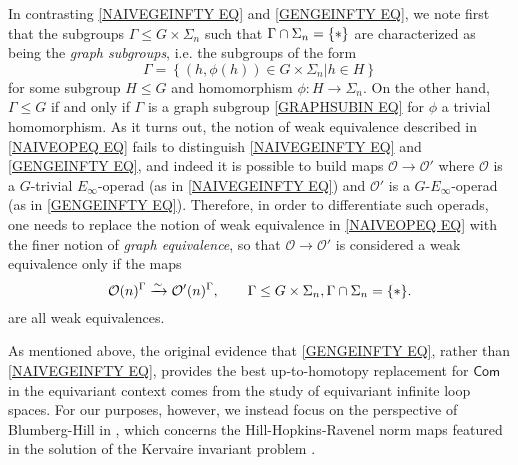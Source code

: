 \documentclass[a4paper,10pt
,draft
]{article}%
\numberwithin{equation}{section}
\numberwithin{figure}{section}
\theoremstyle{definition} %
\renewcommand{\O}{\ensuremath{\mathcal O}}
\newcommand{\1}{\ensuremath{\mathbbm 1}}%
\begin{document}
In contrasting 
\eqref{NAIVEGEINFTY EQ} and \eqref{GENGEINFTY EQ},
we note first that the subgroups $\Gamma \leq G \times \Sigma_n$ such that $\Gamma \cap \Sigma_n = \{\**\}$
are characterized as being the 
\emph{graph subgroups},
i.e. the subgroups of the form
\begin{equation}\label{GRAPHSUBIN EQ}
	\Gamma = \left\{(h,\phi(h)) \in G \times \Sigma_n
	| h \in H\right\}
\end{equation}
for some subgroup $H \leq G$ and homomorphism
$\phi \colon H \to \Sigma_n$.
On the other hand, $\Gamma \leq G$ if and only if $\Gamma$ is a graph subgroup \eqref{GRAPHSUBIN EQ} for $\phi$ a trivial homomorphism. 
As it turns out, the notion of weak equivalence described in \eqref{NAIVEOPEQ EQ} fails to distinguish
\eqref{NAIVEGEINFTY EQ} and \eqref{GENGEINFTY EQ}, 
and indeed it is possible
to build maps $\O \to \O'$ where
$\O$ is a $G$-trivial $E_{\infty}$-operad (as in \eqref{NAIVEGEINFTY EQ})
and $\O'$ is a $G$-$E_{\infty}$-operad 
(as in \eqref{GENGEINFTY EQ}).
Therefore, in order to differentiate such operads, one needs to replace the notion of weak equivalence in \eqref{NAIVEOPEQ EQ} 
with the finer notion of \textit{graph equivalence}, 
so that $\O \to \O'$ is considered a weak equivalence only if
the maps
\begin{equation}\label{GENEOPEQ EQ}
	\O(n)^{\Gamma} \xrightarrow{\sim} \O'(n)^{\Gamma}, \qquad
	\Gamma \leq G\times \Sigma_n, \Gamma \cap \Sigma_n = \{\**\}.
\end{equation}
are all weak equivalences.

As mentioned above, the original evidence \cite{CW91}
that \eqref{GENGEINFTY EQ}, 
rather than \eqref{NAIVEGEINFTY EQ}, 
provides the best up-to-homotopy replacement for $\mathsf{Com}$ in the equivariant context comes from the study of equivariant infinite loop spaces. %
For our purposes, however, we instead focus on the perspective of Blumberg-Hill in \cite{BH15},
which concerns the Hill-Hopkins-Ravenel norm maps featured in the solution of the Kervaire invariant problem \cite{HHR}.
\end{document}
